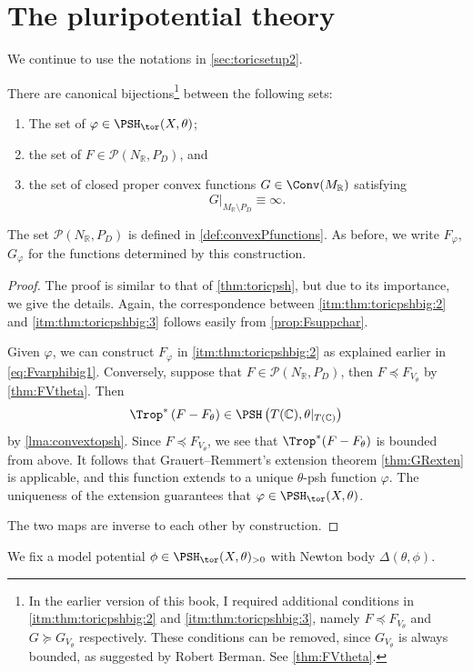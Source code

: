 \section{The pluripotential theory}\label{sec:toric_ppt_general}
We continue to use the notations in \cref{sec:toricsetup2}.

\begin{theorem}\label{thm:toricpshbig}
    There are canonical bijections\footnote{In the earlier version of this book, I required additional conditions in \ref{itm:thm:toricpshbig:2} and \ref{itm:thm:toricpshbig:3}, namely $F\preceq F_{V_{\theta}}$ and $G\succeq G_{V_{\theta}}$ respectively. These conditions can be removed, since $G_{V_{\theta}}$ is always bounded, as suggested by Robert Berman. See \cref{thm:FVtheta}.} between the following sets:
    \begin{enumerate}
        \item\label{itm:thm:toricpshbig:1} The set of $\varphi\in \PSH_{\tor}(X,\theta)$;
        \item\label{itm:thm:toricpshbig:2} the set of $F\in \mathcal{P}(N_{\mathbb{R}},P_D)$, and
        \item\label{itm:thm:toricpshbig:3} the set of closed proper convex functions $G\in \Conv(M_{\mathbb{R}})$ satisfying
        \[
        G|_{M_{\mathbb{R}}\setminus P_D}\equiv \infty.
        \]
    \end{enumerate}
\end{theorem}
The set $\mathcal{P}(N_{\mathbb{R}},P_D)$ is defined in \cref{def:convexPfunctions}.
As before, we write $F_{\varphi}$, $G_{\varphi}$ for the functions determined by this construction.

\begin{proof}
    The proof is similar to that of \cref{thm:toricpsh}, but due to its importance, we give the details. Again, the correspondence between \ref{itm:thm:toricpshbig:2} and \ref{itm:thm:toricpshbig:3} follows easily from \cref{prop:Fsuppchar}.


    Given $\varphi$, we can construct $F_{\varphi}$ in \ref{itm:thm:toricpshbig:2} as explained earlier in \eqref{eq:Fvarphibig1}. Conversely, suppose that $F\in \mathcal{P}(N_{\mathbb{R}},P_D)$, then $F\preceq F_{V_{\theta}}$ by \cref{thm:FVtheta}. Then
    \[
        \Trop^*\left(F-F_{\theta}\right)\in \PSH\left(T(\mathbb{C}),\theta|_{T(\mathbb{C})}\right)
    \]
    by \cref{lma:convextopsh}.
    Since $F\preceq F_{V_{\theta}}$, we see that $\Trop^*(F-F_{\theta})$ is bounded from above. It follows that Grauert--Remmert's extension theorem \cref{thm:GRexten} is applicable, and this function extends to a unique $\theta$-psh function $\varphi$. The uniqueness of the extension guarantees that $\varphi\in \PSH_{\tor}(X,\theta)$.

    The two maps are inverse to each other by construction.
\end{proof}
We fix a model potential $\phi\in \PSH_{\tor}(X,\theta)_{>0}$ with Newton body $\Delta(\theta,\phi)$.


